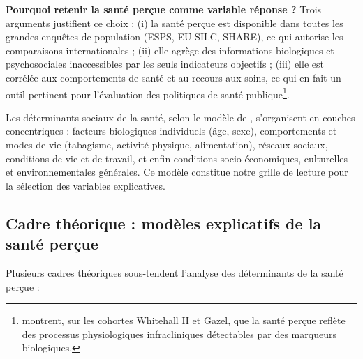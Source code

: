 \documentclass[11pt,a4paper]{memoirerecherche}
\begin{document}
\textbf{Pourquoi retenir la santé perçue comme variable réponse ?} Trois arguments justifient ce choix : (i) la santé perçue est disponible dans toutes les grandes enquêtes de population (ESPS, EU-SILC, SHARE), ce qui autorise les comparaisons internationales \autocite{van_doorslaer2004} ; (ii) elle agrège des informations biologiques et psychosociales inaccessibles par les seuls indicateurs objectifs \autocite{jylha2009} ; (iii) elle est corrélée aux comportements de santé et au recours aux soins, ce qui en fait un outil pertinent pour l'évaluation des politiques de santé publique\footnote{\textcite{singh2006} montrent, sur les cohortes Whitehall II et Gazel, que la santé perçue reflète des processus physiologiques infracliniques détectables par des marqueurs biologiques.}.

Les déterminants sociaux de la santé, selon le modèle de \textcite{dahlgren1991}, s'organisent en couches concentriques : facteurs biologiques individuels (âge, sexe), comportements et modes de vie (tabagisme, activité physique, alimentation), réseaux sociaux, conditions de vie et de travail, et enfin conditions socio-économiques, culturelles et environnementales générales. Ce modèle constitue notre grille de lecture pour la sélection des variables explicatives.

\hypertarget{cadre-thuxe9orique-moduxe8les-explicatifs-de-la-santuxe9-peruxe7ue}{%
\subsection{Cadre théorique : modèles explicatifs de la santé perçue}\label{cadre-thuxe9orique-moduxe8les-explicatifs-de-la-santuxe9-peruxe7ue}}

Plusieurs cadres théoriques sous-tendent l'analyse des déterminants de la santé perçue :
\end{document}
